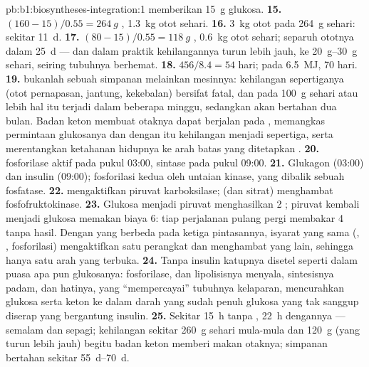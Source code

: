 \begin{solution}{pb:b1:biosyntheses-integration:1}
memberikan \qty{15}{g} glukosa.
\textbf{15.} $(160 - 15)/0.55 = \qty{264}{g}$ , \qty{1.3}{kg}
otot sehari.
\textbf{16.} \qty{3}{kg}  otot pada \qty{264}{g} sehari: sekitar
\qty{11}{d}.
\textbf{17.} $(80 - 15)/0.55 = \qty{118}{g}$ , \qty{0.6}{kg}
otot sehari; separuh ototnya dalam \qty{25}{d} --- dan dalam praktik
kehilangannya turun lebih jauh, ke \qtyrange{20}{30}{g} sehari, seiring
tubuhnya berhemat.
\textbf{18.} $456/8.4 = 54$ hari; pada \qty{6.5}{MJ}, 70 hari.
\textbf{19.}  bukanlah sebuah simpanan melainkan mesinnya:
kehilangan sepertiganya (otot pernapasan, jantung,  kekebalan)
bersifat fatal, dan pada \qty{100}{g} sehari atau lebih hal itu terjadi
dalam beberapa minggu, sedangkan  akan bertahan dua bulan.
Badan keton membuat otaknya dapat berjalan pada , memangkas
permintaan glukosanya dan dengan itu kehilangan  menjadi
sepertiga, serta merentangkan ketahanan hidupnya ke arah batas yang
ditetapkan .
\textbf{20.}  fosforilase aktif pada pukul 03:00, 
sintase pada pukul 09:00.
\textbf{21.} Glukagon (03:00) dan insulin (09:00); fosforilasi kedua
 oleh untaian kinase, yang dibalik sebuah fosfatase.
\textbf{22.}  mengaktifkan piruvat karboksilase;  (dan
sitrat) menghambat fosfofruktokinase.
\textbf{23.} Glukosa menjadi piruvat menghasilkan 2 ; piruvat
kembali menjadi glukosa memakan biaya 6: tiap perjalanan pulang pergi
membakar 4  tanpa hasil. Dengan  yang berbeda pada ketiga
pintasannya, isyarat yang sama (, , fosforilasi)
mengaktifkan satu perangkat dan menghambat yang lain, sehingga hanya
satu arah yang terbuka.
\textbf{24.} Tanpa insulin katupnya disetel seperti dalam puasa apa pun
glukosanya: fosforilase,  dan lipolisisnya menyala,
sintesisnya padam, dan hatinya, yang ``mempercayai'' tubuhnya
kelaparan, mencurahkan glukosa serta keton ke dalam darah yang sudah
penuh glukosa yang tak sanggup diserap  yang bergantung
insulin.
\textbf{25.} Sekitar \qty{15}{h} tanpa , \qty{22}{h}
dengannya --- semalam dan sepagi; kehilangan  sekitar
\qty{260}{g} sehari mula-mula dan \qty{120}{g} (yang turun lebih jauh)
begitu badan keton memberi makan otaknya; simpanan  bertahan
sekitar \qtyrange{55}{70}{d}.
\end{solution}

